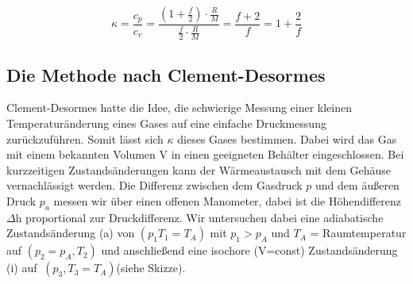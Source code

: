 \documentclass{article}
\begin{document}
{\begin{equation}
\label{18}
\kappa =\frac{c_{p}}{c_{v}}=\frac{\left(1+\frac{f}{2}\right)\cdot \frac{R}{M}}{\frac{f}{2}\cdot \frac{R}{M}}=\frac{f+2}{f}=1+\frac{2}{f}
\end{equation}

\subsection{Die Methode nach Clement-Desormes}
Clement-Desormes hatte die Idee, die schwierige Messung einer kleinen Temperaturänderung eines Gases auf eine einfache Druckmessung zurückzuführen. Somit lässt sich \(\kappa\) dieses Gases bestimmen.  
Dabei wird das Gas mit einem bekannten Volumen V in einen geeigneten Behälter eingeschlossen. Bei kurzzeitigen Zustandsänderungen kann der Wärmeaustausch mit dem Gehäuse vernachlässigt werden. Die Differenz zwischen dem Gasdruck \(p\) und dem äußeren Druck \(p_{a}\) messen wir über einen offenen Manometer, dabei ist die Höhendifferenz \(\Delta\)h proportional zur Druckdifferenz. Wir untersuchen dabei eine adiabatische Zustandsänderung (a) von \((p_{1} T_{1} = T_{A})\) mit \(p_{1} > p_{A}\) und \(T_{A}\) = Raumtemperatur auf \((p_{2} = p_{A}, T_{2})\) und anschließend eine isochore (V=const) Zustandsänderung (i) auf \(\ (p_{3}, T_{3}=T_{A})\)(siehe Skizze).\\

\begin{center}
\begin{minipage}{\linewidth}
\centering
{}
\label{wtd}
\end{minipage}
\end{center}

}
\end{document}
